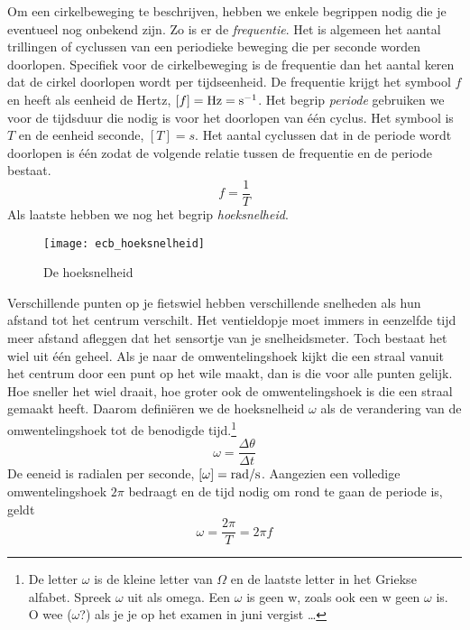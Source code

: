 Om een cirkelbeweging te beschrijven, hebben we enkele begrippen nodig die je eventueel nog onbekend zijn. Zo is er de \emph{frequentie}. Het is algemeen het aantal trillingen of cyclussen van een periodieke beweging die per seconde worden doorlopen. Specifiek voor de cirkelbeweging is de frequentie dan het aantal keren dat de cirkel doorlopen wordt per tijdseenheid. De frequentie krijgt het symbool $f$ en heeft als eenheid de Hertz, $[f]=\rm Hz=s^{-1}$. Het begrip \emph{periode} gebruiken we voor de tijdsduur die nodig is voor het doorlopen van \'e\'en cyclus. Het symbool is $T$ en de eenheid seconde, $[T]=s$. Het aantal cyclussen dat in de periode wordt doorlopen is \'e\'en zodat de volgende relatie tussen de frequentie en de periode bestaat.
\begin{equation*}
f=\frac{1}{T}
\end{equation*}
Als laatste hebben we nog het begrip \emph{hoeksnelheid}. 
\begin{figure}[h]
\centering 
\texttt{[image: ecb\_hoeksnelheid]}
\caption{De hoeksnelheid}
\end{figure}
Verschillende punten op je fietswiel hebben verschillende snelheden als hun afstand tot het centrum verschilt. Het ventieldopje moet immers in eenzelfde tijd meer afstand afleggen dat het sensortje van je snelheidsmeter. Toch bestaat het wiel uit \'e\'en geheel. Als je naar de omwentelingshoek kijkt die een straal vanuit het centrum door een punt op het wile maakt, dan is die voor alle punten gelijk. Hoe sneller het wiel draait, hoe groter ook de omwentelingshoek is die een straal gemaakt heeft. Daarom defini\"eren we de hoeksnelheid $\omega$ als de verandering van de omwentelingshoek tot de benodigde tijd.\footnote{De letter $\omega$ is de kleine letter van $\Omega$ en de laatste letter in het Griekse alfabet. Spreek $\omega$ uit als omega. Een $\omega$ is geen w, zoals ook een w geen $\omega$ is. O wee ($\omega$?) als je je op het examen in juni vergist \ldots}
\begin{equation*}
\omega=\frac{\Delta\theta}{\Delta t}
\end{equation*}
De eeneid is radialen per seconde, $[\omega]=\rm rad/s$. Aangezien een volledige omwentelingshoek $2\pi$ bedraagt en de tijd nodig om rond te gaan de periode is, geldt
\begin{equation}
\omega=\frac{2\pi}{T}=2\pi f\label{hoeksnelheid}
\end{equation}

